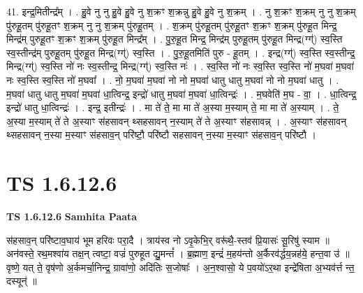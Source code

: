 \documentclass[17pt]{extarticle}
\begin{document}
41. इन्द्र॒मितीन्द्र᳚म् । . हु॒वे नु नु हु॒वे हु॒वे नु श॒क्रꣳ श॒क्रन्नु हु॒वे हु॒वे नु श॒क्रम् । . नु श॒क्रꣳ श॒क्रम् नु नु श॒क्रम् पु॑रुहू॒तम् पु॑रुहू॒तꣳ श॒क्रम् नु नु श॒क्रम् पु॑रुहू॒तम् । . श॒क्रम् पु॑रुहू॒तम् पु॑रुहू॒तꣳ श॒क्रꣳ श॒क्रम् पु॑रुहू॒त मिन्द्र॒ मिन्द्र॑म् पुरुहू॒तꣳ श॒क्रꣳ श॒क्रम् पु॑रुहू॒त मिन्द्र᳚म् । . पु॒रु॒हू॒त मिन्द्र॒ मिन्द्र॑म् पुरुहू॒तम् पु॑रुहू॒त मिन्द्र(ग्ग्॑) स्व॒स्ति स्व॒स्तीन्द्र॑म् पुरुहू॒तम् पु॑रुहू॒त मिन्द्र(ग्ग्॑) स्व॒स्ति । . पु॒रु॒हू॒तमिति॑ पुरु - हू॒तम् । . इन्द्र(ग्ग्॑) स्व॒स्ति स्व॒स्तीन्द्र॒ मिन्द्र(ग्ग्॑) स्व॒स्ति नो॑ नः स्व॒स्तीन्द्र॒ मिन्द्र(ग्ग्॑) स्व॒स्ति नः॑ । . स्व॒स्ति नो॑ नः स्व॒स्ति स्व॒स्ति नो॑ म॒घवा॑ म॒घवा॑ नः स्व॒स्ति स्व॒स्ति नो॑ म॒घवा᳚ । . नो॒ म॒घवा॑ म॒घवा॑ नो नो म॒घवा॑ धातु धातु म॒घवा॑ नो नो म॒घवा॑ धातु । . म॒घवा॑ धातु धातु म॒घवा॑ म॒घवा॑ धा॒त्विन्द्र॒ इन्द्रो॑ धातु म॒घवा॑ म॒घवा॑ धा॒त्विन्द्रः॑ । . म॒घवेति॑ म॒घ - वा॒ । . धा॒त्विन्द्र॒ इन्द्रो॑ धातु धा॒त्विन्द्रः॑ । . इन्द्र॒ इतीन्द्रः॑ । . मा ते॑ ते॒ मा मा ते॑ अ॒स्या म॒स्याम् ते॒ मा मा ते॑ अ॒स्याम् । . ते॒ अ॒स्या म॒स्याम् ते॑ ते अ॒स्याꣳ स॑हसावन् थ्सहसावन् न॒स्याम् ते॑ ते अ॒स्याꣳ स॑हसावन्न् । . अ॒स्याꣳ स॑हसावन् थ्सहसावन् न॒स्या म॒स्याꣳ स॑हसाव॒न् परि॑ष्टौ॒ परि॑ष्टौ सहसावन् न॒स्या म॒स्याꣳ स॑हसाव॒न् परि॑ष्टौ । \newline
\pagebreak
{}
\section*{ TS 1.6.12.6 }

\textbf{TS 1.6.12.6 } \newline
\textbf{Samhita Paata} \newline

स॑हसाव॒न् परि॑ष्टाव॒घाय॑ भूम हरिवः परा॒दै । त्राय॑स्व नो ऽवृ॒केभि॒र् वरू॑थै॒-स्तव॑ प्रि॒यासः॑ सू॒रिषु॑ स्याम ॥ अन॑वस्ते॒ रथ॒मश्वा॑य तक्ष॒न् त्वष्टा॒ वज्रं॑ पुरुहूत द्यु॒मन्तं᳚ । ब्र॒ह्माण॒ इन्द्रं॑ म॒हय॑न्तो अ॒र्कैरव॑र्द्धय॒न्नह॑ये॒ हन्त॒वा उ॑ ॥ वृष्णे॒ यत् ते॒ वृष॑णो अ॒र्कमर्चा॒निन्द्र॒ ग्रावा॑णो॒ अदि॑तिः स॒जोषाः᳚ । अ॒न॒श्वासो॒ ये प॒वयो॑ऽर॒था इन्द्रे॑षिता अ॒भ्यव॑र्त्त न्त॒॒ दस्यून्॑ ॥ \newline
\end{document}
